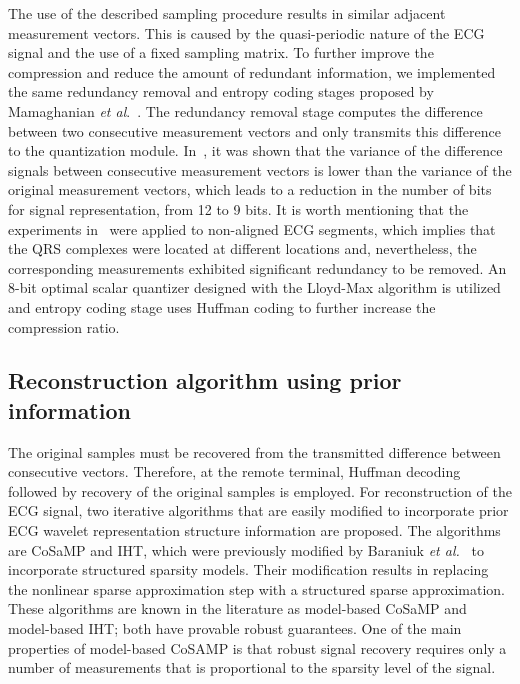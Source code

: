 \documentclass[journal]{IEEEtran}
\begin{document}
The use of the described sampling procedure results in similar adjacent measurement vectors. This is caused by the quasi-periodic nature of the ECG signal and the use of a fixed sampling matrix. To further improve the compression and reduce the amount of redundant information, we implemented the same redundancy removal and entropy coding stages proposed by Mamaghanian \textit{et al}.~\cite{Mama11}. The redundancy removal stage computes the difference between two consecutive measurement vectors and only transmits this difference to the quantization module. In~\cite{Mama11}, it was shown that the variance of the difference signals between consecutive measurement vectors is lower than the variance of the original measurement vectors, which leads to a reduction in the number of bits for signal representation, from 12 to 9 bits. It is worth mentioning that the experiments in~\cite{Mama11} were applied to non-aligned ECG segments, which implies that the QRS complexes were located at different locations and, nevertheless, the corresponding measurements exhibited significant redundancy to be removed. An 8-bit optimal scalar quantizer designed with the Lloyd-Max algorithm is utilized~\cite{Gers92} and entropy coding stage uses Huffman coding to further increase the compression ratio.

\subsection{Reconstruction algorithm using prior information}
The original samples must be recovered from the transmitted difference between consecutive vectors. Therefore, at the remote terminal, Huffman decoding followed by recovery of the original samples is employed. For reconstruction of the ECG signal, two iterative algorithms that are easily modified to incorporate prior ECG wavelet representation structure information are proposed. The algorithms are CoSaMP and IHT, which were previously modified by Baraniuk \textit{et al.}~\cite{Bara10} to incorporate structured sparsity models. Their modification results in replacing the nonlinear sparse approximation step with a structured sparse approximation. These algorithms are known in the literature as model-based CoSaMP and model-based IHT; both have provable robust guarantees. One of the main properties of model-based CoSAMP is that robust signal recovery requires only a number of measurements that is proportional to the sparsity level of the signal.
\end{document}
